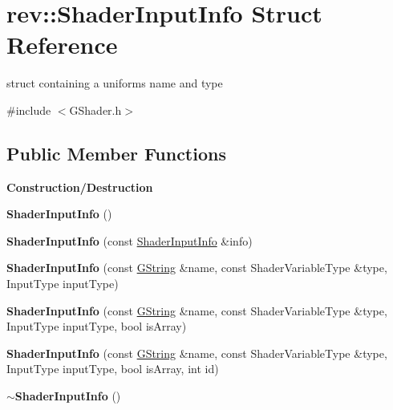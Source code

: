 \hypertarget{structrev_1_1_shader_input_info}{}\section{rev\+::Shader\+Input\+Info Struct Reference}
\label{structrev_1_1_shader_input_info}


struct containing a uniform\textquotesingle{}s name and type  




{\ttfamily \#include $<$G\+Shader.\+h$>$}

\subsection*{Public Member Functions}
\begin{Indent}\textbf{ Construction/\+Destruction}\par
\begin{DoxyCompactItemize}
\item 
\mbox{\label{structrev_1_1_shader_input_info_a6d8db790a14df243a617daef499e39c3}} 
{\bfseries Shader\+Input\+Info} ()
\item 
\mbox{\label{structrev_1_1_shader_input_info_a98ddf1ba219ea89655c3c4e23b0ef13b}} 
{\bfseries Shader\+Input\+Info} (const \mbox{\hyperlink{structrev_1_1_shader_input_info}{Shader\+Input\+Info}} \&info)
\item 
\mbox{\label{structrev_1_1_shader_input_info_a1802ff6817903cbbd31e6f70b3bba834}} 
{\bfseries Shader\+Input\+Info} (const \mbox{\hyperlink{classrev_1_1_g_string}{G\+String}} \&name, const Shader\+Variable\+Type \&type, Input\+Type input\+Type)
\item 
\mbox{\label{structrev_1_1_shader_input_info_a1f93e45234ad4096ee1da7a54dab2c9d}} 
{\bfseries Shader\+Input\+Info} (const \mbox{\hyperlink{classrev_1_1_g_string}{G\+String}} \&name, const Shader\+Variable\+Type \&type, Input\+Type input\+Type, bool is\+Array)
\item 
\mbox{\label{structrev_1_1_shader_input_info_a92cc3a1e01dcccf0bf5a49249d90acb7}} 
{\bfseries Shader\+Input\+Info} (const \mbox{\hyperlink{classrev_1_1_g_string}{G\+String}} \&name, const Shader\+Variable\+Type \&type, Input\+Type input\+Type, bool is\+Array, int id)
\item 
\mbox{\label{structrev_1_1_shader_input_info_a71dfaf97d23ba09f93a886b0e29a617f}} 
{\bfseries $\sim$\+Shader\+Input\+Info} ()
\end{DoxyCompactItemize}
\end{Indent}
